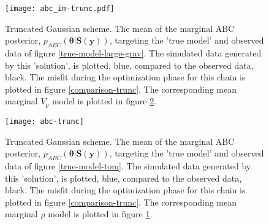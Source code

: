 \begin{figure}[H]
	\centering
	\texttt{[image: abc\_im-trunc.pdf]}
	\caption{Truncated Gaussian scheme. The mean of the marginal ABC posterior, $p_{ABC}(\bm{\theta}|\bm{S}(\bm{y}))$, targeting the 'true model' and observed data of figure \ref{true-model-large-grav}. The simulated data generated by this 'solution', is plotted, blue, compared to the observed data, black. The misfit during the optimization phase for this chain is plotted in figure \ref{comparison-trunc}. The corresponding mean marginal $V_p$ model is plotted in figure \ref{tom-trunc}.}
	\label{grav-trunc}
\end{figure}

\begin{figure}[H]
	\centering
	\texttt{[image: abc-trunc]}
	\caption{Truncated Gaussian scheme. The mean of the marginal ABC posterior, $p_{ABC}(\bm{\theta}|\bm{S}(\bm{y}))$, targeting the 'true model' and observed data of figure \ref{true-model-tom}. The simulated data generated by this 'solution', is plotted, blue, compared to the observed data, black. The misfit during the optimization phase for this chain is plotted in figure \ref{comparison-trunc}. The corresponding mean marginal $\rho$ model is plotted in figure \ref{grav-trunc}.}
	\label{tom-trunc}
\end{figure}

